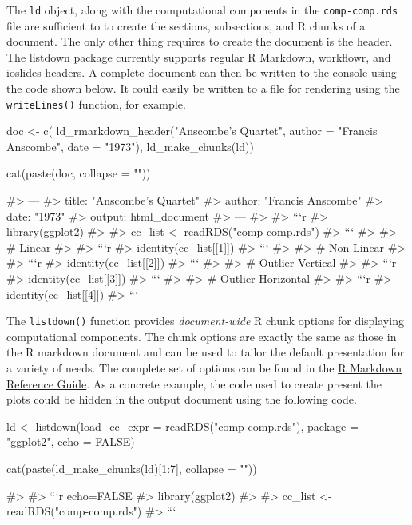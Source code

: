 The \texttt{ld} object, along with the computational components in the
\texttt{comp-comp.rds} file are sufficient to to create the sections,
subsections, and R chunks of a document. The only other thing requires
to create the document is the header. The listdown package currently
supports regular R Markdown, workflowr, and ioslides headers. A complete
document can then be written to the console using the code shown below.
It could easily be written to a file for rendering using the
\texttt{writeLines()} function, for example.

\begin{Schunk}
\begin{Sinput}
doc <- c(
  ld_rmarkdown_header("Anscombe's Quartet",
                     author = "Francis Anscombe",
                     date = "1973"),
  ld_make_chunks(ld))

cat(paste(doc, collapse = "\n"))
\end{Sinput}
\begin{Soutput}
#> ---
#> title: "Anscombe's Quartet"
#> author: "Francis Anscombe"
#> date: "1973"
#> output: html_document
#> ---
#> 
#> ```{r}
#> library(ggplot2)
#> 
#> cc_list <- readRDS("comp-comp.rds")
#> ```
#> 
#> # Linear
#> 
#> ```{r}
#> identity(cc_list[[1]])
#> ```
#> 
#> # Non Linear
#> 
#> ```{r}
#> identity(cc_list[[2]])
#> ```
#> 
#> # Outlier Vertical
#> 
#> ```{r}
#> identity(cc_list[[3]])
#> ```
#> 
#> # Outlier Horizontal
#> 
#> ```{r}
#> identity(cc_list[[4]])
#> ```
\end{Soutput}
\end{Schunk}

The \texttt{listdown()} function provides \emph{document-wide} R chunk
options for displaying computational components. The chunk options are
exactly the same as those in the R markdown document and can be used to
tailor the default presentation for a variety of needs. The complete set
of options can be found in the
\href{https://rstudio.com/wp-content/uploads/2015/03/rmarkdown-reference.pdf}{R
Markdown Reference Guide}. As a concrete example, the code used to
create present the plots could be hidden in the output document using
the following code.

\begin{Schunk}
\begin{Sinput}
ld <- listdown(load_cc_expr = readRDS("comp-comp.rds"), 
               package = "ggplot2",
               echo = FALSE)

cat(paste(ld_make_chunks(ld)[1:7], collapse = "\n"))
\end{Sinput}
\begin{Soutput}
#> 
#> ```{r echo=FALSE}
#> library(ggplot2)
#> 
#> cc_list <- readRDS("comp-comp.rds")
#> ```
\end{Soutput}
\end{Schunk}

